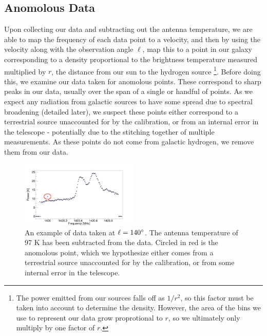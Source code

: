 \subsection{Anomolous Data}
Upon collecting our data and subtracting out the antenna temperature, we are able to map the frequency of each data point to a velocity, and then by using the velocity along with the observation angle $\ell$, map this to a point in our galaxy corresponding to a density proportional to the brightness temperature measured multiplied by $r$, the distance from our sun to the hydrogen source \footnote{The power emitted from our sources falls off as $1/r^2$, so this factor must be taken into account to determine the density. However, the area of the bins we use to represent our data grow proprotional to $r$, so we ultimately only multiply by one factor of $r$.}. Before doing this, we examine our data taken for anomolous points. These correspond to sharp peaks in our data, usually over the span of a single or handful of points. As we expect any radiation from galactic sources to have some spread due to spectral broadening (detailed later), we suspect these points either correspond to a terrestrial source unaccounted for by the calibration, or from an internal error in the telescope - potentially due to the stitching together of multiple measurements. As these points do not come from galactic hydrogen, we remove them from our data.

\begin{figure}
  \includegraphics[width=0.5\textwidth]{anomolous}
  \caption{An example of data taken at $\ell=140\degree$. The antenna temperature of 97 K has been subtracted from the data. Circled in red is the anomolous point, which we hypothesize either comes from a terrestrial source unaccounted for by the calibration, or from some internal error in the telescope.}
\end{figure}

